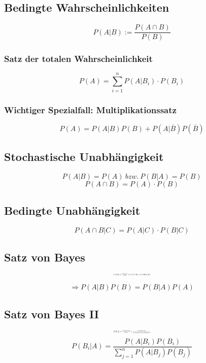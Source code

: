 \documentclass[10pt,a4paper,landscape]{article}
\begin{document}
\begin{multicols}{4}
\subsection{Bedingte Wahrscheinlichkeiten}
\[
P(A|B) := \frac{P(A\cap B)}{P(B)}
\]

\subsubsection*{Satz der totalen Wahrscheinlichkeit}
\[
P(A)=\sum_{i=1}^n P(A|B_i) \cdot P(B_i)
\]

\subsubsection*{Wichtiger Spezialfall: Multiplikationssatz}
\[
P(A)=P(A|B)P(B)+P(A|\overline{B})P(\overline{B})
\]

\subsection{Stochastische Unabhängigkeit}
\[
P(A|B) = P(A) ~bzw.~ P(B|A)=P(B)
\]
\[
P(A \cap B)=P(A) \cdot P(B)
\]

\subsection{Bedingte Unabhängigkeit}
\[
P(A \cap B|C)=P(A|C)\cdot P(B|C)
\]

\subsection{Satz von Bayes}
\[ \resizebox{0.15\textwidth}{!}{$
P(A|B)=\frac{P(A\cap B)}{P(B)} \Rightarrow P(A\cap B)=P(A|B)P(B)
$}
\]

\[
\Rightarrow P(A|B)P(B)=P(B|A)P(A)
\]

\subsection{Satz von Bayes II}
\[ \resizebox{0.15\textwidth}{!}{$
P(B|A)=\frac{P(A|B)P(B)}{P(A)}=\frac{P(A|B)P(B)}{P(A|B)P(B)+P(A|\overline{B})P(\overline{B})}
$}
\]
\[ 
P(B_i|A)=\frac{P(A|B_i)P(B_i)}{\sum_{j=1}^n P(A|B_j)P(B_j)}
\]



\end{multicols}
\end{document}
